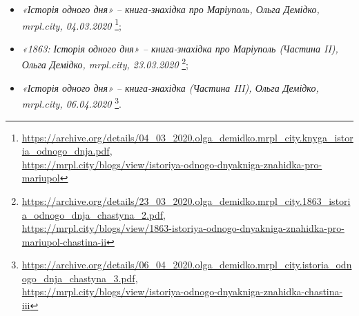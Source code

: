 \documentclass[a4paper,20pt]{report}
\begin{document}
\begin{itemize}
	\item \emph{«Історія одного дня» – книга-знахідка про Маріуполь, Ольга Демідко, mrpl.city, 04.03.2020}
	\footnote{\url{https://archive.org/details/04_03_2020.olga_demidko.mrpl_city.knyga_istoria_odnogo_dnja.pdf},\\
	\url{https://mrpl.city/blogs/view/istoriya-odnogo-dnyakniga-znahidka-pro-mariupol}};

	\item \emph{«1863: Історія одного дня» – книга-знахідка про Маріуполь (Частина II), Ольга Демідко, mrpl.city, 23.03.2020}
	\footnote{\url{https://archive.org/details/23_03_2020.olga_demidko.mrpl_city.1863_istoria_odnogo_dnja_chastyna_2.pdf},\\
				\url{https://mrpl.city/blogs/view/1863-istoriya-odnogo-dnyakniga-znahidka-pro-mariupol-chastina-ii}};

	\item \emph{«Історія одного дня» – книга-знахідка (Частина III), Ольга Демідко, mrpl.city, 06.04.2020}
	\footnote{\url{https://archive.org/details/06_04_2020.olga_demidko.mrpl_city.istoria_odnogo_dnja_chastyna_3.pdf},\\
	\url{https://mrpl.city/blogs/view/istoriya-odnogo-dnyakniga-znahidka-chastina-iii}}.
	
\end{itemize}

\clearpage

\clearpage


\clearpage


\end{document}
